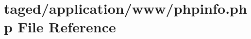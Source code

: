 \hypertarget{phpinfo_8php}{}\section{taged/application/www/phpinfo.php File Reference}
\label{phpinfo_8php}
